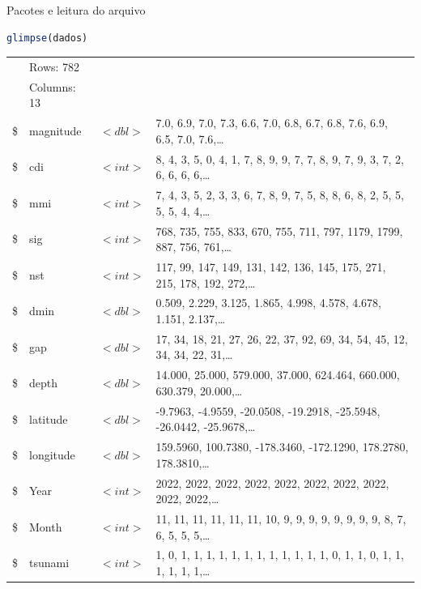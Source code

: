 \documentclass[aspectratio= 169, xcolor=dvipsnames]{beamer}
\begin{document}
\begin{frame}[fragile]{Pacotes e leitura do arquivo}
    \begin{lstlisting}[language=R]
    glimpse(dados)
    \end{lstlisting}
    \begin{block}{}
\begin{table}[h]
\scriptsize
\centering
\begin{tabular}{llll}
& Rows: 782 \\
& Columns: 13 \\
\$ & magnitude & \(<dbl>\) & 7.0, 6.9, 7.0, 7.3, 6.6, 7.0, 6.8, 6.7, 6.8, 7.6, 6.9, 6.5, 7.0, 7.6,… \\
\$  & cdi & \(<int>\) & 8, 4, 3, 5, 0, 4, 1, 7, 8, 9, 9, 7, 7, 8, 9, 7, 9, 3, 7, 2, 6, 6, 6, 6,… \\
\$  & mmi & \(<int>\) & 7, 4, 3, 5, 2, 3, 3, 6, 7, 8, 9, 7, 5, 8, 8, 6, 8, 2, 5, 5, 5, 5, 4, 4,… \\
\$  & sig & \(<int>\) & 768, 735, 755, 833, 670, 755, 711, 797, 1179, 1799, 887, 756, 761,… \\
\$  & nst & \(<int>\) & 117, 99, 147, 149, 131, 142, 136, 145, 175, 271, 215, 178, 192, 272,… \\
\$  & dmin & \(<dbl>\) & 0.509, 2.229, 3.125, 1.865, 4.998, 4.578, 4.678, 1.151, 2.137,… \\
\$  & gap & \(<dbl>\) & 17, 34, 18, 21, 27, 26, 22, 37, 92, 69, 34, 54, 45, 12, 34, 34, 22, 31,… \\
\$  & depth & \(<dbl>\) & 14.000, 25.000, 579.000, 37.000, 624.464, 660.000, 630.379, 20.000,… \\
\$  & latitude & \(<dbl>\) & -9.7963, -4.9559, -20.0508, -19.2918, -25.5948, -26.0442, -25.9678,… \\
\$  & longitude & \(<dbl>\) & 159.5960, 100.7380, -178.3460, -172.1290, 178.2780, 178.3810,… \\
\$  & Year & \(<int>\) & 2022, 2022, 2022, 2022, 2022, 2022, 2022, 2022, 2022, 2022,… \\
\$  & Month & \(<int>\) & 11, 11, 11, 11, 11, 11, 10, 9, 9, 9, 9, 9, 9, 9, 9, 8, 7, 6, 5, 5, 5,… \\
\$  & tsunami & \(<int>\) & 1, 0, 1, 1, 1, 1, 1, 1, 1, 1, 1, 1, 1, 1, 0, 1, 1, 0, 1, 1, 1, 1, 1, 1,…
\end{tabular}
\end{table}
    \end{block}
\end{frame}
\end{document}
